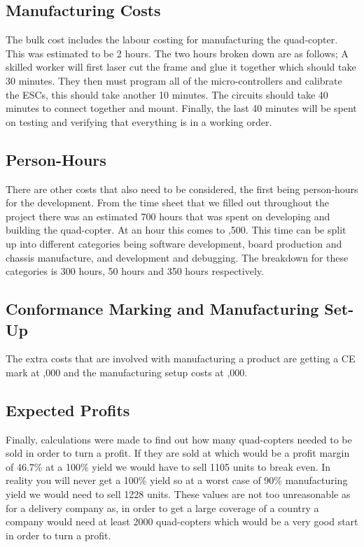 \documentclass[a4paper,11pt]{article}
\begin{document}
\subsection{Manufacturing Costs}
The bulk cost includes the labour costing for manufacturing the quad-copter. This was estimated to be 2 hours. The two hours broken down are as follows; A skilled worker will first laser cut the frame and glue it together which should take 30 minutes. They then must program all of the micro-controllers and calibrate the ESCs, this should take another 10 minutes. The circuits should take 40 minutes to connect together and mount. Finally, the last 40 minutes will be spent on testing and verifying that everything is in a working order.\\
\subsection{Person-Hours}
There are other costs that also need to be considered, the first being person-hours for the development. From the time sheet that we filled out throughout the project there was an estimated 700 hours that was spent on developing and building the quad-copter. At  an hour this comes to ,500. This time can be split up into different categories being software development, board production and chassis manufacture, and development and debugging. The breakdown for these categories is 300 hours, 50 hours and 350 hours respectively.\\ 
\subsection{Conformance Marking and Manufacturing Set-Up}
The extra costs that are involved with manufacturing a product are getting a CE mark at ,000 and the manufacturing setup costs at ,000.\\
\subsection{Expected Profits}
Finally, calculations were made to find out how many quad-copters needed to be sold in order to turn a profit. If they are sold at  which would be a profit margin of 46.7\% at a 100\% yield we would have to sell 1105 units to break even. In reality you will never get a 100\% yield so at a worst case of 90\% manufacturing yield we would need to sell 1228 units. These values are not too unreasonable as for a delivery company as, in order to get a large coverage of a country a company would need at least 2000 quad-copters which would be a very good start in order to turn a profit.\\ 
\end{document}

